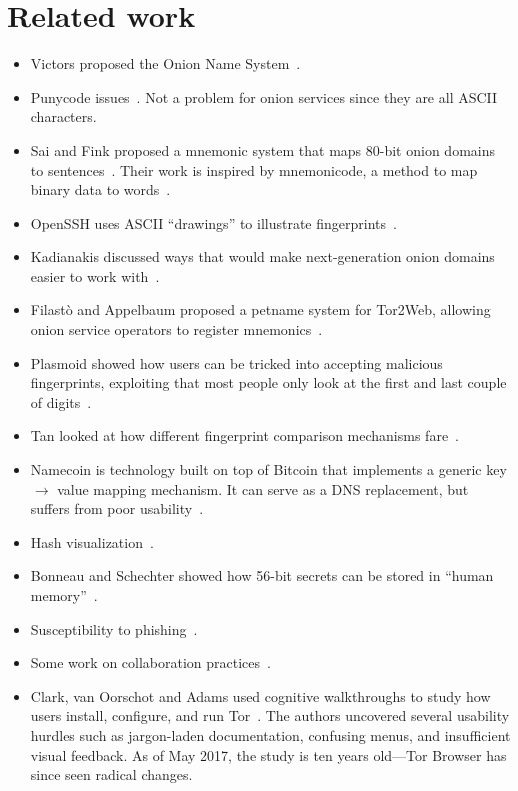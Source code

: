 \section{Related work}
\label{sec:related-work}

\begin{itemize}
    \item Victors \ea proposed the Onion Name System~\cite{Victors2017a}.
    \item Punycode issues~\cite{Zheng2017a}.  Not a problem for onion services
        since they are all ASCII characters.
    \item Sai and Fink proposed a mnemonic system that maps 80-bit onion domains
        to sentences~\cite{Sai2012a}.  Their work is inspired by mnemonicode, a
        method to map binary data to words~\cite{mnemonicode}.
    \item OpenSSH uses ASCII ``drawings'' to illustrate
        fingerprints~\cite{Loss2009a}.
    \item Kadianakis discussed ways that would make next-generation onion
        domains easier to work with~\cite{Kadianakis2017a}.
    \item Filast{\`o} and Appelbaum proposed a petname system for Tor2Web,
        allowing onion service operators to register
        mnemonics~\cite{Filasto2011a}.
    \item Plasmoid showed how users can be tricked into accepting malicious
        fingerprints, exploiting that most people only look at the first and
        last couple of digits~\cite{Plasmoid2003a}.
    \item Tan \ea looked at how different fingerprint comparison mechanisms
        fare~\cite{Tan2017a}.
    \item Namecoin is technology built on top of Bitcoin that implements a
        generic key $\rightarrow$ value mapping mechanism.  It can serve as a
        DNS replacement, but suffers from poor usability~\cite{Kalodner2015a}.
    \item Hash visualization~\cite{Perrig1999a,Dhamija2005a}.
    \item Bonneau and Schechter showed how 56-bit secrets can be stored in
        ``human memory''~\cite{Bonneau2014a}.
    \item Susceptibility to phishing~\cite{Downs2006a,Sheng2010a}.
    \item Some work on collaboration practices~\cite{Forte2017a}.

    \item Clark, van Oorschot and Adams used cognitive walkthroughs to study
        how users install, configure, and run Tor~\cite{Clark2007a}.  The
        authors uncovered several usability hurdles such as jargon-laden
        documentation, confusing menus, and insufficient visual feedback.  As
        of May 2017, the study is ten years old---Tor Browser has since seen
        radical changes.


\end{itemize}
